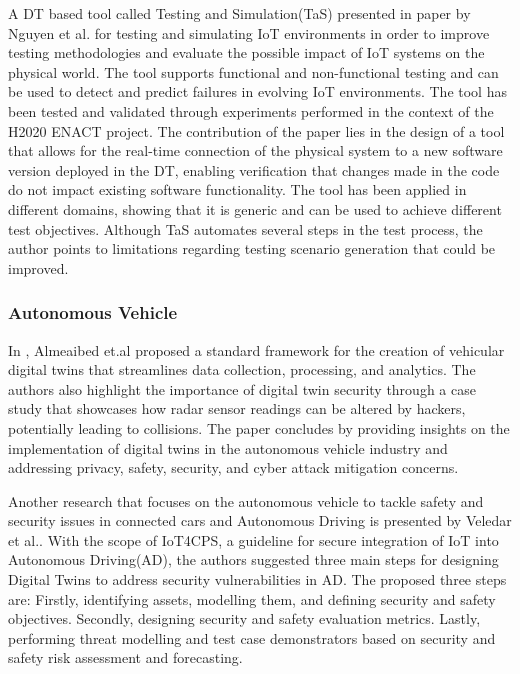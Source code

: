 A DT based tool called Testing and Simulation(TaS) presented in\cite{luongnguyenDigitalTwinIoT2022} paper by Nguyen et al. for testing and simulating IoT environments in order to improve testing methodologies and evaluate the possible impact of IoT systems on the physical world. The tool supports functional and non-functional testing and can be used to detect and predict failures in evolving IoT environments. The tool has been tested and validated through experiments performed in the context of the H2020 ENACT project. The contribution of the paper lies in the design of a tool that allows for the real-time connection of the physical system to a new software version deployed in the DT, enabling verification that changes made in the code do not impact existing software functionality. The tool has been applied in different domains, showing that it is generic and can be used to achieve different test objectives. Although TaS automates several steps in the test process, the author points to limitations regarding testing scenario generation that could be improved.


\subsubsection{Autonomous Vehicle}
In \cite{almeaibedDigitalTwinAnalysis2021}, Almeaibed et.al proposed a standard framework for the creation of vehicular digital twins that streamlines data collection, processing, and analytics. The authors also highlight the importance of digital twin security through a case study that showcases how radar sensor readings can be altered by hackers, potentially leading to collisions. The paper concludes by providing insights on the implementation of digital twins in the autonomous vehicle industry and addressing privacy, safety, security, and cyber attack mitigation concerns.

Another research that focuses on the autonomous vehicle to tackle safety and security issues in connected cars and Autonomous Driving is presented by Veledar et al.\cite{veledarDigitalTwinsDependability2019}.
With the scope of IoT4CPS, a guideline for secure integration of IoT into Autonomous Driving(AD), the authors suggested three main steps for designing Digital Twins to address security vulnerabilities in AD. The proposed three steps are: Firstly, identifying assets, modelling them, and defining security and safety objectives. Secondly, designing security and safety evaluation metrics. Lastly, performing threat modelling and test case demonstrators based on security and safety risk assessment and forecasting.

